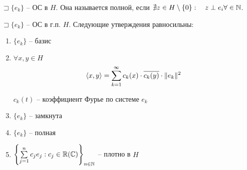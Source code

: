 \begin{definition}
    $\sqsupset \{e_k\}$ -- ОС в $H$. Она называется полной, если $\nexists z\in H \setminus \{0\}:\quad z\perp e_i \forall \in \mathbb{N} $.
\end{definition}

\begin{theorem}
    $\sqsupset \{e_k\}$ -- ОС в г.п. $H$. Следующие утверждения равносильны:
    \begin{enumerate}
        \item $\{e_k\}$ -- базис
        \item $\forall x, y\in H$
        \[ \left<x, y \right> = \sum_{k=1}^{\infty } c_k(x) \cdot \ov {c_k (y)}\cdot \|e_k\|^2 \]

        $c_k(t)$ -- коэффициент Фурье по системе $e_k$
        \item $\{e_k\}$ -- замкнута
        \item $\{e_k\}$ -- полная
        \item $\left\{\sum_{j=1}^{n} c_j e_j: c_j\in \R(\C)\right\}_{n\in \N }$ -- плотно в $H$
    \end{enumerate}
\end{theorem}


